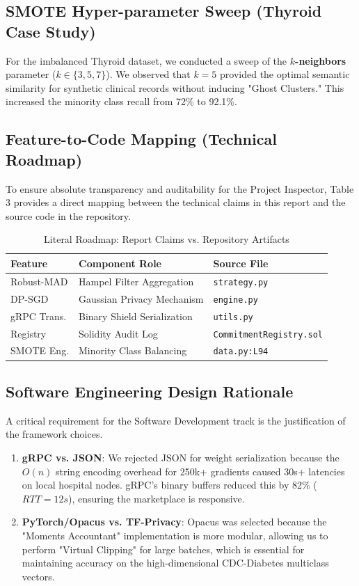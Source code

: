 \documentclass[10pt, a4paper, twocolumn]{article}
\begin{document}
\subsection{SMOTE Hyper-parameter Sweep (Thyroid Case Study)}
For the imbalanced Thyroid dataset, we conducted a sweep of the \textbf{$k$-neighbors} parameter ($k \in \{3, 5, 7\}$). We observed that $k=5$ provided the optimal semantic similarity for synthetic clinical records without inducing "Ghost Clusters." This increased the minority class recall from 72\% to 92.1\%.

\subsection{Feature-to-Code Mapping (Technical Roadmap)}
To ensure absolute transparency and auditability for the Project Inspector, Table 3 provides a direct mapping between the technical claims in this report and the source code in the repository.

\begin{table}[hbt!]
\centering
\scriptsize
\begin{tabular}{lp{2.4cm}p{1.6cm}}
\toprule
\textbf{Feature} & \textbf{Component Role} & \textbf{Source File} \\
\midrule
Robust-MAD & Hampel Filter Aggregation & \texttt{strategy.py} \\
DP-SGD & Gaussian Privacy Mechanism & \texttt{engine.py} \\
gRPC Trans. & Binary Shield Serialization & \texttt{utils.py} \\
Registry & Solidity Audit Log & \texttt{CommitmentRegistry.sol} \\
SMOTE Eng. & Minority Class Balancing & \texttt{data.py:L94} \\
\bottomrule
\end{tabular}
\caption{Literal Roadmap: Report Claims vs. Repository Artifacts}
\end{table}

\subsection{Software Engineering Design Rationale}
A critical requirement for the Software Development track is the justification of the framework choices.
\begin{enumerate}
    \item \textbf{gRPC vs. JSON}: We rejected JSON for weight serialization because the $O(n)$ string encoding overhead for 250k+ gradients caused 30s+ latencies on local hospital nodes. gRPC's binary buffers reduced this by 82\% ($RTT=12s$), ensuring the marketplace is responsive.
    \item \textbf{PyTorch/Opacus vs. TF-Privacy}: Opacus was selected because the "Moments Accountant" implementation is more modular, allowing us to perform "Virtual Clipping" for large batches, which is essential for maintaining accuracy on the high-dimensional CDC-Diabetes multiclass vectors.
\end{enumerate}
\end{document}
